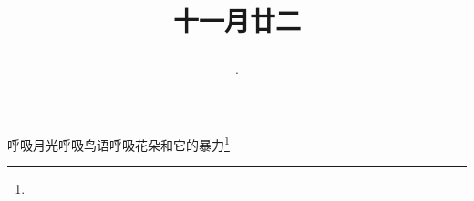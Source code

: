 \title{\date[d=3,m=1,y=2024][year:cn-y,年,month:cn,day:cn,日,·,weekday]·十一月廿二 }
呼吸月光呼吸鸟语呼吸花朵和它的暴力\footnote{ }

